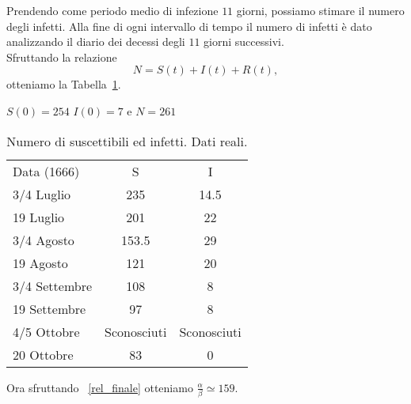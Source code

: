 Prendendo come periodo medio di infezione  $11$ giorni, possiamo stimare il numero degli infetti. Alla fine di ogni intervallo di tempo il numero di infetti \`e dato analizzando il diario dei decessi degli $11$ giorni successivi.\\
Sfruttando la relazione 
$$ N = S(t) + I(t) + R(t),$$ 
otteniamo la Tabella~\ref{table::2}.
\begin{table}[!h]
\centering
\caption{Numero di suscettibili ed infetti. Dati reali.}

 $S(0) = 254$ $I(0) = 7$ e $N = 261$ 	\\
\label{table::2}
\begin{tabular}{l|c|c}

Data (1666) & S & I\\
\cline{1-3}
3/4 Luglio  & 235& 14.5\\
19 Luglio  & 201 & 22\\
3/4 Agosto  & 153.5& 29\\
19  Agosto  & 121& 20\\
3/4 Settembre  & 108&  8\\
19 Settembre  & 97& 8\\
4/5 Ottobre  & Sconosciuti& Sconosciuti\\
20 Ottobre  & 83& 0\\
 
\end{tabular}
\end{table}

Ora sfruttando ~\eqref{rel_finale} otteniamo $\frac{\alpha}{\beta} \simeq 159$.
\newpage

